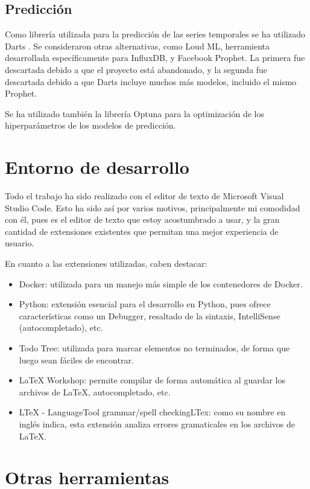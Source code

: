 \subsection{Predicción}

Como librería utilizada para la predicción de las series temporales se ha utilizado Darts \cite{JMLR:v23:21-1177}.
Se consideraron otras alternativas, como Loud ML, herramienta desarrollada específicamente para InfluxDB, y 
Facebook Prophet. La primera fue descartada debido a que el proyecto está abandonado, y la segunda fue descartada 
debido a que Darts incluye muchos más modelos, incluido el mismo Prophet.

Se ha utilizado también la librería Optuna para la optimización de los hiperparámetros de los modelos de predicción.

\section{Entorno de desarrollo}

Todo el trabajo ha sido realizado con el editor de texto de Microsoft Visual Studio Code. Esto ha sido así por 
varios motivos, principalmente mi comodidad con él, pues es el editor de texto que estoy acostumbrado a usar, y 
la gran cantidad de extensiones existentes que permitan una mejor experiencia de usuario.

En cuanto a las extensiones utilizadas, caben destacar:
\begin{itemize}
    \item Docker: utilizada para un manejo más simple de los contenedores de Docker.
    \item Python: extensión esencial para el desarrollo en Python, pues ofrece características como un Debugger, 
        resaltado de la sintaxis, IntelliSense (autocompletado), etc.
    \item Todo Tree: utilizada para marcar elementos no terminados, de forma que luego sean fáciles de encontrar.
    \item LaTeX Workshop: permite compilar de forma automática al guardar los archivos de LaTeX, autocompletado, etc.
    \item LTeX - LanguageTool grammar/spell checkingLTex: como su nombre en inglés indica, esta extensión analiza 
        errores gramaticales en los archivos de LaTeX.
\end{itemize}


\section{Otras herramientas}


